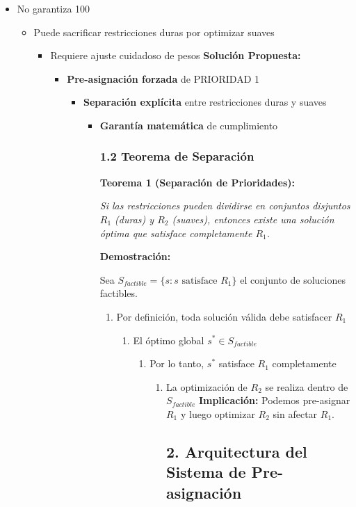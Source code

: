 \begin{itemize}
\item No garantiza 100%
\begin{itemize}
\item Puede sacrificar restricciones duras por optimizar suaves
\begin{itemize}
\item Requiere ajuste cuidadoso de pesos
\textbf{Solución Propuesta:}

\begin{itemize}
\item \textbf{Pre-asignación forzada} de PRIORIDAD 1
\begin{itemize}
\item \textbf{Separación explícita} entre restricciones duras y suaves
\begin{itemize}
\item \textbf{Garantía matemática} de cumplimiento

\subsubsection{1.2 Teorema de Separación}

\textbf{Teorema 1 (Separación de Prioridades):}

\textit{Si las restricciones pueden dividirse en conjuntos disjuntos $R_1$ (duras) y $R_2$ (suaves), entonces existe una solución óptima que satisface completamente $R_1$.}

\textbf{Demostración:}

Sea $S_{factible} = \{s : s \text{ satisface } R_1\}$ el conjunto de soluciones factibles.

\begin{enumerate}
\item Por definición, toda solución válida debe satisfacer $R_1$
\begin{enumerate}
\item El óptimo global $s^* \in S_{factible}$
\begin{enumerate}
\item Por lo tanto, $s^*$ satisface $R_1$ completamente
\begin{enumerate}
\item La optimización de $R_2$ se realiza dentro de $S_{factible}$
\textbf{Implicación:} Podemos pre-asignar $R_1$ y luego optimizar $R_2$ sin afectar $R_1$.


\subsection{2. Arquitectura del Sistema de Pre-asignación}



\end{enumerate}
\end{enumerate}
\end{enumerate}
\end{enumerate}
\end{itemize}
\end{itemize}
\end{itemize}
\end{itemize}
\end{itemize}
\end{itemize}
